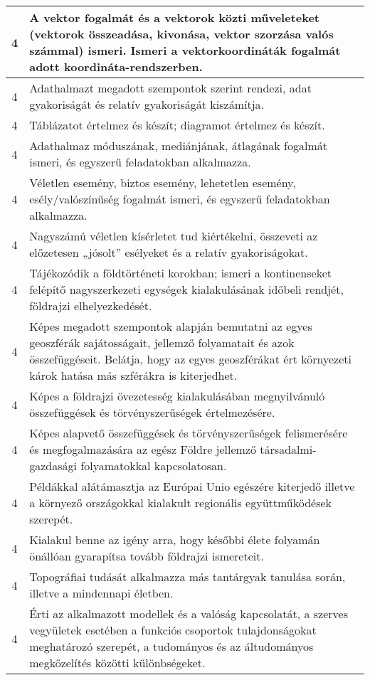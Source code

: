 \begin{longtable}{c | p{12cm} }
                                          4 &  A vektor fogalmát és a vektorok közti műveleteket (vektorok összeadása, kivonása, vektor szorzása valós számmal) ismeri. Ismeri a vektorkoordináták fogalmát adott koordináta-rendszerben. \\ \hline
                                          4 &  Adathalmazt megadott szempontok szerint rendezi, adat gyakoriságát és relatív gyakoriságát kiszámítja. \\ \hline
                                          4 &  Táblázatot értelmez és készít; diagramot értelmez és készít. \\ \hline
                                          4 &  Adathalmaz móduszának, mediánjának, átlagának fogalmát ismeri, és egyszerű feladatokban alkalmazza. \\ \hline
                                          4 &  Véletlen esemény, biztos esemény, lehetetlen esemény, esély/valószínűség fogalmát ismeri, és egyszerű feladatokban alkalmazza. \\ \hline
                                          4 &  Nagyszámú véletlen kísérletet tud kiértékelni, összeveti az előzetesen „jósolt” esélyeket és a relatív gyakoriságokat. \\ \hline
                                          4 &  Tájékozódik a földtörténeti korokban; ismeri a kontinenseket felépítő nagyszerkezeti egységek kialakulásának időbeli rendjét, földrajzi elhelyezkedését. \\ \hline
                                          4 &  Képes megadott szempontok alapján bemutatni az egyes geoszférák sajátosságait, jellemző folyamatait és azok összefüggéseit. Belátja, hogy az egyes geoszférákat ért környezeti károk hatása más szférákra is kiterjedhet. \\ \hline
                                          4 &  Képes a földrajzi övezetesség kialakulásában megnyilvánuló összefüggések és törvényszerűségek értelmezésére. \\ \hline
                                          4 &  Képes alapvető összefüggések és törvényszerűségek felismerésére és megfogalmazására az egész Földre jellemző társadalmi-gazdasági folyamatokkal kapcsolatosan. \\ \hline
                                          4 &  Példákkal alátámasztja az Európai Unio egészére kiterjedő illetve a környező országokkal kialakult regionális együttműködések szerepét. \\ \hline
                                          4 &  Kialakul benne az igény arra, hogy későbbi élete folyamán önállóan gyarapítsa tovább földrajzi ismereteit. \\ \hline
                                          4 &  Topográfiai tudását alkalmazza más tantárgyak tanulása során, illetve a mindennapi életben. \\ \hline
                                          4 &  Érti az alkalmazott modellek és a valóság kapcsolatát, a szerves vegyületek esetében a funkciós csoportok tulajdonságokat meghatározó szerepét, a tudományos és az áltudományos megközelítés közötti különbségeket. \\ \hline
                                      

\end{longtable}
